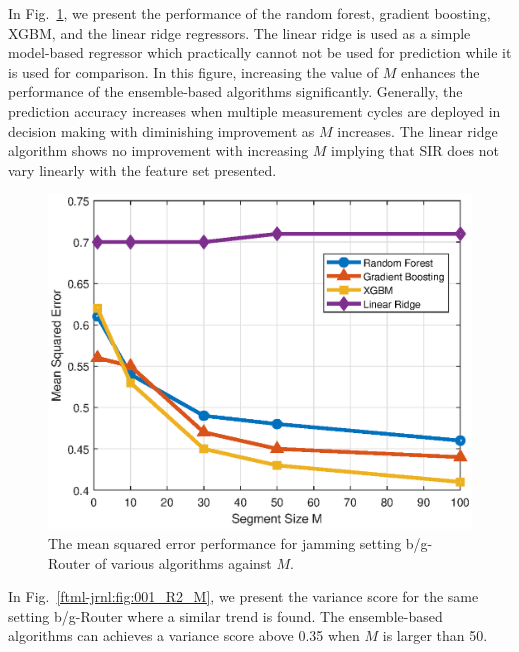 In Fig.~\ref{ftml-jrnl:fig:001_MSE_M}, we present the performance of the random forest, gradient boosting, XGBM, and the linear ridge regressors. The linear ridge is used as a simple model-based regressor which practically cannot not be used for prediction while it is used for comparison. In this figure, increasing the value of $M$ enhances the performance of the ensemble-based algorithms significantly. Generally, the prediction accuracy increases when multiple measurement cycles are deployed in decision making with diminishing improvement as $M$ increases.  The linear ridge algorithm shows no improvement with increasing $M$ implying that SIR does not vary linearly with the feature set presented.

\begin{figure}[!ht]
	\centering
	\includegraphics[width=0.9\columnwidth]{./chapter-ftml/plots/001_MSE_M.eps}
	\caption{The mean squared error performance for jamming setting b/g-Router of various algorithms against $M$.}
	\label{ftml-jrnl:fig:001_MSE_M}      
\end{figure}

In Fig.~\ref{ftml-jrnl:fig:001_R2_M}, we present the variance score for the same setting b/g-Router where a similar trend is found. The ensemble-based algorithms can achieves a variance score above 0.35 when $M$ is larger than 50. 

